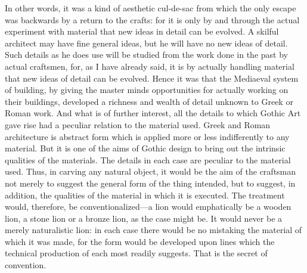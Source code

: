 \documentclass{book}
\begin{document}
In other words, it was a kind of aesthetic cul-de-sac from which the only escape was backwards by a return to the crafts: for it is only by and through the actual experiment with material that new ideas in detail can be evolved. A skilful architect may have fine general ideas, but he will have no new ideas of detail. Such details as he does use will be studied from the work done in the past by actual craftsmen, for, as I have already said, it is by actually handling material that new ideas of detail can be evolved. Hence it was that the Mediaeval system of building, by giving the master minds opportunities for actually working on their buildings, developed a richness and wealth of detail unknown to Greek or Roman work. And what is of further interest, all the details to which Gothic Art gave rise had a peculiar relation to the material used. Greek and Roman architecture is abstract form which is applied more or less indifferently to any material. But it is one of the aims of Gothic design to bring out the intrinsic qualities of the materials. The details in each case are peculiar to the material used. Thus, in carving any natural object, it would be the aim of the craftsman not merely to suggest the general form of the thing intended, but to suggest, in addition, the qualities of the material in which it is executed. The treatment would, therefore, be conventionalized—a lion would emphatically be a wooden lion, a stone lion or a bronze lion, as the case might be. It would never be a merely naturalistic lion: in each case there would be no mistaking the material of which it was made, for the form would be developed upon lines which the technical production of each most readily suggests. That is the secret of convention.
\end{document}
